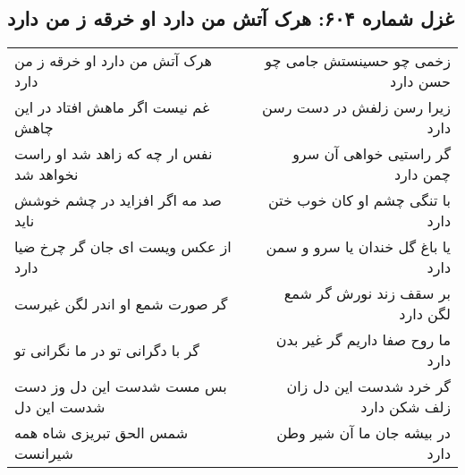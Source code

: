 \begin{center}
\section*{غزل شماره ۶۰۴: هرک آتش من دارد او خرقه ز من دارد}
\label{sec:0604}
\begin{longtable}{l p{0.5cm} r}
هرک آتش من دارد او خرقه ز من دارد
&&
زخمی چو حسینستش جامی چو حسن دارد
\\
غم نیست اگر ماهش افتاد در این چاهش
&&
زیرا رسن زلفش در دست رسن دارد
\\
نفس ار چه که زاهد شد او راست نخواهد شد
&&
گر راستیی خواهی آن سرو چمن دارد
\\
صد مه اگر افزاید در چشم خوشش ناید
&&
با تنگی چشم او کان خوب ختن دارد
\\
از عکس ویست ای جان گر چرخ ضیا دارد
&&
یا باغ گل خندان یا سرو و سمن دارد
\\
گر صورت شمع او اندر لگن غیرست
&&
بر سقف زند نورش گر شمع لگن دارد
\\
گر با دگرانی تو در ما نگرانی تو
&&
ما روح صفا داریم گر غیر بدن دارد
\\
بس مست شدست این دل وز دست شدست این دل
&&
گر خرد شدست این دل زان زلف شکن دارد
\\
شمس الحق تبریزی شاه همه شیرانست
&&
در بیشه جان ما آن شیر وطن دارد
\\
\end{longtable}
\end{center}
